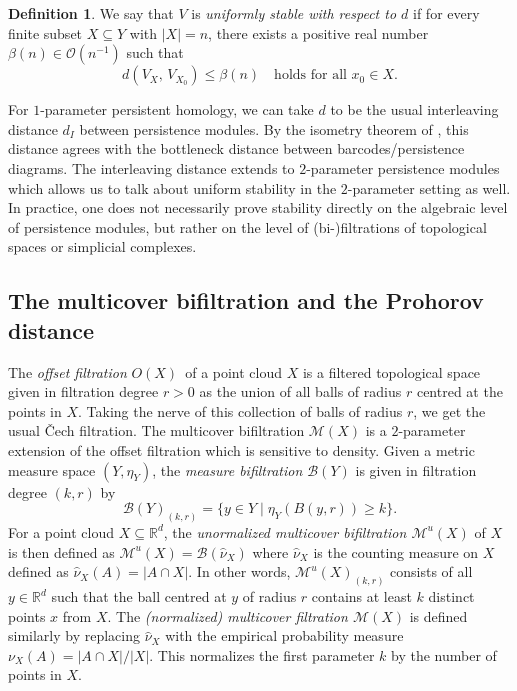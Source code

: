 \documentclass[10pt,a4paper]{article}
\theoremstyle{definition}
\newtheorem{defn}[thm]{Definition}
\newcommand{\R}{\mathbb{R}}
\begin{document}
\begin{defn}\label{def_uniform_stability}
	We say that $V$ is \textit{uniformly stable with respect to $d$} if for every finite subset $X\subseteq Y$ with $|X|=n$, there exists a positive real number $\beta(n)\in\mathcal{O}(n^{-1})$ such that
	\begin{equation}\label{eq_uniform_stability}
		 d\left(V_X,\,V_{X_0}\right) \leqslant \beta(n)\quad\text{holds for all }x_0\in X.
	\end{equation}
\end{defn}

For $1$-parameter persistent homology, we can take $d$ to be the usual interleaving distance $d_I$ between persistence modules. By the isometry theorem of \autocite{Bauer2015}, this distance agrees with the bottleneck distance between barcodes/persistence diagrams. The interleaving distance extends to $2$-parameter persistence modules which allows us to talk about uniform stability in the $2$-parameter setting as well. In practice, one does not necessarily prove stability directly on the algebraic level of persistence modules, but rather on the level of (bi-)filtrations of topological spaces or simplicial complexes.

\subsection{The multicover bifiltration and the Prohorov distance}
The \textit{offset filtration} $O(X)$ of a point cloud $X$ is a filtered topological space given in filtration degree $r>0$ as the union of all balls of radius $r$ centred at the points in $X$. Taking the nerve of this collection of balls of radius $r$, we get the usual Čech filtration. The multicover bifiltration $\mathcal{M}(X)$ is a $2$-parameter extension of the offset filtration which is sensitive to density. Given a metric measure space $(Y,\eta_Y)$, the \textit{measure bifiltration $\mathcal{B}(Y)$} is given in filtration degree $(k,r)$ by $$\mathcal{B}(Y)_{(k,r)}=\{y\in Y\mid\eta_Y(B(y,r))\geq k\}.$$
For a point cloud $X\subseteq\R^d$, the \textit{unormalized multicover bifiltration $\mathcal{M}^u(X)$} of $X$ is then defined as $\mathcal{M}^u(X)=\mathcal{B}(\hat{\nu}_X)$ where $\hat{\nu}_X$ is the counting measure on $X$ defined as $\hat{\nu}_X(A)=|A\cap X|$. In other words, $\mathcal{M}^u(X)_{(k,r)}$ consists of all $y\in \R^d$ such that the ball centred at $y$ of radius $r$ contains at least $k$ distinct points $x$ from $X$. The \textit{(normalized) multicover filtration $\mathcal{M}(X)$} is defined similarly by replacing $\hat{\nu}_X$ with the empirical probability measure $\nu_X(A)=|A\cap X|/|X|$. This normalizes the first parameter $k$ by the number of points in $X$.
\end{document}
